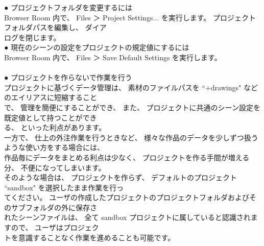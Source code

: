 \documentclass[a4paper,10pt]{article}
\begin{document}
\newpage

\noindent● プロジェクトフォルダを変更するには\\
\normalsize
Browser Room 内で、 Files ＞ Project Settings... を実行します。 プロジェクトフォルダパスを編集し、 ダイア\\
ログを閉じます。\\
\large
● 現在のシーンの設定をプロジェクトの規定値にするには\\
\normalsize
Browser Room 内で、 Files ＞ Save Default Settings を実行します。\\
\\[0.5em]
\large
● プロジェクトを作らないで作業を行う\\
\normalsize
プロジェクトに基づくデータ管理は、 素材のファイルパスを “+drawings" などのエイリアスに短縮すること\\
で、 管理を簡便にすることができ、 また、 プロジェクトに共通のシーン設定を既定値として持つことができ\\
る、 といった利点があります。\\
一方で、 仕上の外注作業を行うときなど、 様々な作品のデータを少しずつ扱うような使い方をする場合には、\\
作品毎にデータをまとめる利点は少なく、 プロジェクトを作る手間が増える分、 不便になってしまいます。\\
そのような場合は、 プロジェクトを作らず、 デフォルトのプロジェクト “sandbox" を選択したまま作業を行っ\\
てください。 ユーザの作成したプロジェクトのプロジェクトフォルダおよびそのサブフォルダの外に保存さ\\
れたシーンファイルは、 全て sandbox プロジェクトに属していると認識されますので、 ユーザはプロジェク\\
トを意識することなく作業を進めることも可能です。\\
\end{document}

